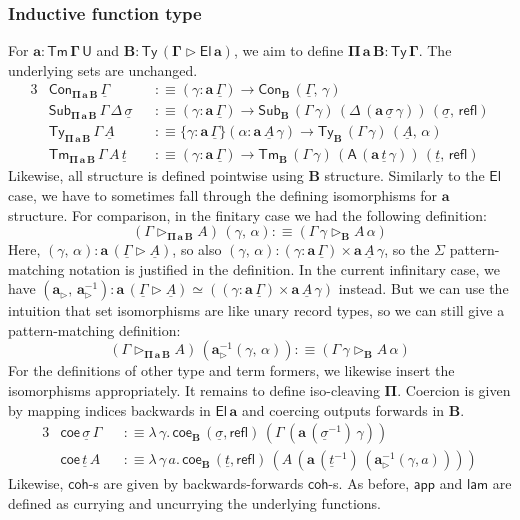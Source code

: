 \documentclass[12pt,a4paper,twoside,openany]{book}
\theoremstyle{remark}
\theoremstyle{definition}
\theoremstyle{theorem}
\newcommand{\bs}[1]{\boldsymbol{#1}}
\newcommand{\refl}{\mathsf{refl}}
\newcommand{\Con}{\mathsf{Con}}
\newcommand{\Sub}{\mathsf{Sub}}
\newcommand{\Tm}{\mathsf{Tm}}
\newcommand{\Ty}{\mathsf{Ty}}
\newcommand{\U}{\mathsf{U}}
\newcommand{\El}{\mathsf{El}}
\newcommand{\ext}{\triangleright}
\newcommand{\appi}{\mathsf{app}}
\newcommand{\lami}{\mathsf{lam}}
\newcommand{\A}{\mathsf{A}}
\newcommand{\bTy}{\bs{\Ty}}
\newcommand{\bGamma}{\bs{\Gamma}}
\newcommand{\ba}{\bs{a}}
\newcommand{\bB}{\bs{B}}
\newcommand{\bEl}{\bs{\El}}
\newcommand{\ul}[1]{\underline{#1}}
\newcommand{\ulGamma}{\ul{\Gamma}}
\newcommand{\ulsigma}{\ul{\sigma}}
\newcommand{\ult}{\ul{t}}
\newcommand{\ulA}{\ul{A}}
\newcommand{\coe}{\mathsf{coe}}
\newcommand{\coh}{\mathsf{coh}}
\newcommand{\defn}{:\equiv}
\begin{document}
\subsubsection{Inductive function type}

For $\boldsymbol{a : \Tm\,\Gamma\,\U}$ and $\boldsymbol{B :
  \Ty\,(\Gamma\ext\El\,a)}$, we aim to define $\boldsymbol{\Pi\,a\,B}
\boldsymbol{:} \bTy\,\bGamma$. The underlying sets are unchanged.
\begin{alignat*}{3}
  & \Con_{\bs{\Pi\,a\,B}}\,\ulGamma &&\defn (\gamma : \ba\,\ulGamma) \to \Con_{\bB}\,(\ulGamma,\,\gamma)\\
  & \Sub_{\bs{\Pi\,a\,B}}\,\Gamma\,\Delta\,\ulsigma &&\defn
    (\gamma : \ba\,\ulGamma)\to \Sub_{\bB}\,(\Gamma\,\gamma)\,(\Delta\,(\ba\,\ulsigma\,\gamma))\,(\ulsigma,\,\refl)\\
  & \Ty_{\bs{\Pi\,a\,B}}\,\Gamma\,\ulA &&\defn
  \{\gamma : \ba\,\ulGamma\}(\alpha : \ba\,\ulA\,\gamma)
  \to \Ty_{\bB}\,(\Gamma\,\gamma)\,(\ulA,\,\alpha)\\
  & \Tm_{\bs{\Pi\,a\,B}}\,\Gamma\,A\,\ult &&\defn
    (\gamma : \ba\,\ulGamma) \to \Tm_{\bB}\,(\Gamma\,\gamma)\,(\A\,(\ba\,\ult\,\gamma))\,(\ult,\,\refl)
\end{alignat*}
Likewise, all structure is defined pointwise using $\bB$ structure. Similarly to
the $\bEl$ case, we have to sometimes fall through the defining isomorphisms for
$\ba$ structure. For comparison, in the finitary case we had the following definition:
\[
  (\Gamma \ext_{\bs{\Pi\,a\,B}} A)\,(\gamma,\,\alpha) \defn (\Gamma\,\gamma \ext_{\bB} A\,\alpha)
\]
Here, $(\gamma,\,\alpha) : \ba\,(\ulGamma \ext \ulA)$, so also
$(\gamma,\,\alpha) : (\gamma : \ba\,\ulGamma) \times \ba\,\ulA\,\gamma$, so the
$\Sigma$ pattern-matching notation is justified in the definition. In the
current infinitary case, we have $(\ba_{\ext},\,\ba_{\ext}^{-1}) :
\ba\,(\ulGamma \ext \ulA) \simeq ((\gamma : \ba\,\ulGamma) \times
\ba\,\ulA\,\gamma)$ instead. But we can use the intuition that set isomorphisms
are like unary record types, so we can still give a pattern-matching definition:
\[
  (\Gamma \ext_{\bs{\Pi\,a\,B}} A)\,(\ba_{\ext}^{-1}(\gamma,\,\alpha)) \defn
   (\Gamma\,\gamma \ext_{\bB} A\,\alpha)
\]
For the definitions of other type and term formers, we likewise insert the
isomorphisms appropriately. It remains to define iso-cleaving
$\bs{\Pi}$. Coercion is given by mapping indices backwards in $\bEl\,\ba$ and
coercing outputs forwards in $\bB$.
\begin{alignat*}{3}
  & \coe\,\ulsigma\,\Gamma &&\defn
    \lambda\,\gamma.\,\coe_{\bB}\,(\ulsigma,\refl)\,(\Gamma\,(\ba\,(\ulsigma^{-1})\,\gamma))\\
  & \coe\,\ult\,A &&\defn
    \lambda\,\gamma\,a.\,\coe_{\bB}\,(\ult,\refl)\,(A\,(\ba\,(\ult^{-1})\,(\ba_{\ext}^{-1}(\gamma,a))))
\end{alignat*}
Likewise, $\coh$-s are given by backwards-forwards $\coh$-s. As before,
$\bs{\appi}$ and $\bs{\lami}$ are defined as currying and uncurrying the
underlying functions.
\end{document}
